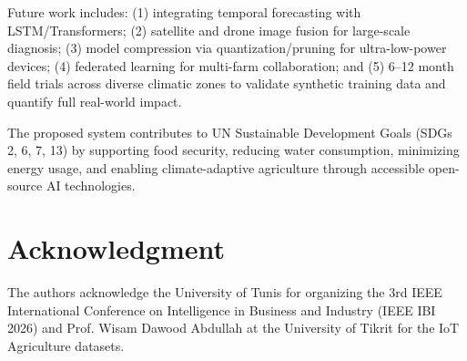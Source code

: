 \documentclass[conference]{IEEEtran}
\begin{document}
Future work includes: (1) integrating temporal forecasting with LSTM/Transformers; (2) satellite and drone image fusion for large-scale diagnosis; (3) model compression via quantization/pruning for ultra-low-power devices; (4) federated learning for multi-farm collaboration; and (5) 6--12 month field trials across diverse climatic zones to validate synthetic training data and quantify full real-world impact.

The proposed system contributes to UN Sustainable Development Goals (SDGs 2, 6, 7, 13) by supporting food security, reducing water consumption, minimizing energy usage, and enabling climate-adaptive agriculture through accessible open-source AI technologies.

\section*{Acknowledgment}

The authors acknowledge the University of Tunis for organizing the 3rd IEEE International Conference on Intelligence in Business and Industry (IEEE IBI 2026) and Prof. Wisam Dawood Abdullah at the University of Tikrit for the IoT Agriculture datasets.
\end{document}
